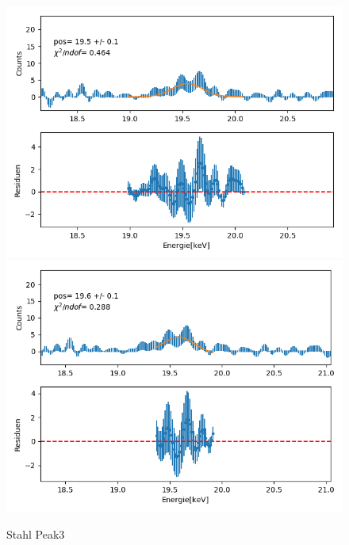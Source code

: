 \documentclass[12pt,a4paper]{article}
\begin{document}
\begin{figure}[H]
\centering
\includegraphics[scale=0.49]{Bilder/alpha_spektren/stahl_3_1.png}
\includegraphics[scale=0.49]{Bilder/alpha_spektren/stahl_3_2.png}
\caption{Stahl Peak3}
\end{figure}
\end{document}
